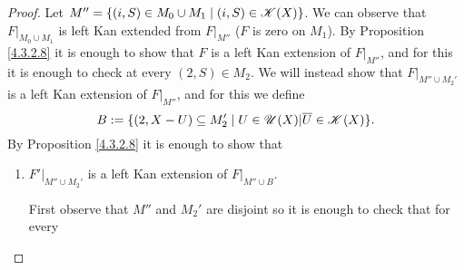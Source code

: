 \documentclass[../../thesis.tex]{subfiles}
\begin{document}
\begin{proof}
    Let $M''=\{(i,S) \in M_0 \cup M_1 \mid (i,S)\in \mathscr{K}(X)\}$.
    We can observe that $F|_{M_0 \cup M_1}$ is left Kan extended from $F|_{M''}$ ($F$ is zero on $M_1$).
    By Proposition \ref{4.3.2.8} it is enough to show that $F$ is a left Kan extension of $F|_{M''}$, and for this it is enough to check at every $(2,S) \in M_2$.
    We will instead show that $F|_{M'' \cup M_2'}$ is a left Kan extension of $F|_{M''}$, and for this we define
    \[B:=\{(2, X- U) \subseteq M_2' \mid U \in \mathscr{U}(X) | \overline{U} \in \mathscr{K}(X)\} .\]
    By Proposition \ref{4.3.2.8} it is enough to show that
    \begin{enumerate}[label=(\alph*)]
        \item $F'|_{M'' \cup M_2'}$ is a left Kan extension of $F|_{M'' \cup B}$.


              First observe that $M''$ and $M_2'$ are disjoint so it is enough to check that for every


\end{enumerate}
\end{proof}
\end{document}
